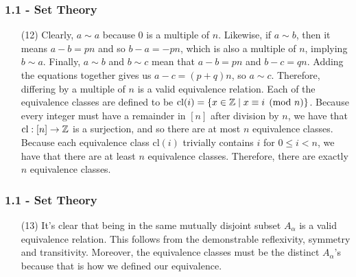 \documentclass{beamer}
\begin{document}
\begin{frame}
\frametitle{1.1 - Set Theory}
\small
\begin{enumerate}
	\item[(12)] Clearly, $a\sim a$ because $0$ is a multiple of $n$. Likewise, if $a\sim b$, then it means $a - b = pn$ and so $b - a = -pn$, which is also a multiple of $n$, implying $b \sim a$. Finally, $a\sim b$ and $b\sim c$ mean that $a - b = pn$ and $b - c = qn$. Adding the equations together gives us $a - c = (p + q)n$, so $a\sim c$. Therefore, differing by a multiple of $n$ is a valid equivalence relation. Each of the equivalence classes are defined to be $\text{cl}(i) = \{x\in \Bbb Z \mid x\equiv i\pmod{n}\}$. Because every integer must have a remainder in $[n]$ after division by $n$, we have that $\text{cl}: [n] \to \Bbb Z$ is a surjection, and so there are at most $n$ equivalence classes. Because each equivalence class $\text{cl}(i)$ trivially contains $i$ for $0\leq i < n$, we have that there are at least $n$ equivalence classes. Therefore, there are exactly $n$ equivalence classes.
\end{enumerate}
\end{frame}
\begin{frame}
\frametitle{1.1 - Set Theory}
\small
\begin{enumerate}
	\item[(13)] It's clear that being in the same mutually disjoint subset $A_\alpha$ is a valid equivalence relation. This follows from the demonstrable reflexivity, symmetry and transitivity. Moreover, the equivalence classes must be the distinct $A_\alpha$'s because that is how we defined our equivalence.
\end{enumerate}
\end{frame}
\end{document}

